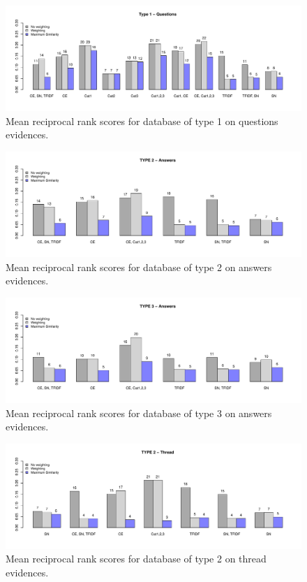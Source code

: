 \documentclass[conference]{IEEEtran}
\begin{document}
\begin{figure}[!t]
	\centering
	\includegraphics[width=\textwidth]{mrrType1Questions.pdf}
	\caption{Mean reciprocal rank scores for database of type 1 on questions evidences.}
	\label{fig:mrrtype1}
\end{figure}

\begin{figure}[!t]
	\centering
	\includegraphics[width=\textwidth]{mrrType2Answers.pdf}
	\caption{Mean reciprocal rank scores for database of type 2 on answers evidences.}
	\label{fig:mrrtype2}
\end{figure}

\begin{figure}[!t]
	\centering
	\includegraphics[width=\textwidth]{mrrType3Answers.pdf}
	\caption{Mean reciprocal rank scores for database of type 3 on answers evidences.}
	\label{fig:mrrtype3}
\end{figure}

\begin{figure}[!t]
	\centering
	\includegraphics[width=\textwidth]{mrrType2Thread.pdf}
	\caption{Mean reciprocal rank scores for database of type 2 on thread evidences.}
	\label{fig:mrrtype3}
\end{figure}
\end{document}
